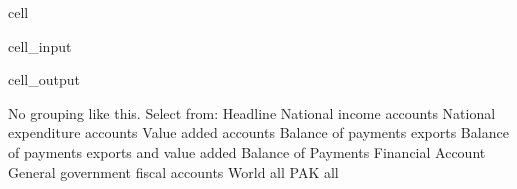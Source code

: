 \documentclass[letterpaper,10pt,english]{jupyterBook}
\begin{document}
\begin{sphinxuseclass}{cell}\begin{sphinxVerbatimInput}

\begin{sphinxuseclass}{cell_input}
\begin{sphinxVerbatim}[commandchars=\\\{\}]
\PYG{p}{[}\PYG{p}{]}
\PYG{p}{[}\PYG{p}{]}
\end{sphinxVerbatim}

\end{sphinxuseclass}\end{sphinxVerbatimInput}
\begin{sphinxVerbatimOutput}

\begin{sphinxuseclass}{cell_output}
\begin{sphinxVerbatim}[commandchars=\\\{\}]
No grouping like this. Select from: 
Headline
National income accounts
National expenditure accounts
Value added accounts
Balance of payments exports
Balance of payments exports and value added 
Balance of Payments Financial Account
General government fiscal accounts
World all
PAK all
\end{sphinxVerbatim}


\end{sphinxuseclass}
\end{sphinxVerbatimOutput}
\end{sphinxuseclass}
\end{document}
